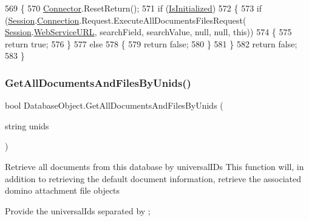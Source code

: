 \begin{DoxyCode}
569     \{
570         \mbox{\hyperlink{class_connector}{Connector}}.ResetReturn();
571         \textcolor{keywordflow}{if} (\mbox{\hyperlink{class_database_object_a5fe036d32a30eb10d1b3f6a30263f740}{IsInitialized}})
572         \{
573             \textcolor{keywordflow}{if} (\mbox{\hyperlink{class_database_object_aa8484162b7d2a7c4c9426bca13c64c07}{Session}}.\mbox{\hyperlink{class_session_object_a014bdbf705a753540e19bfb53030c55c}{Connection}}.Request.ExecuteAllDocumentsFilesRequest(
      \mbox{\hyperlink{class_database_object_aa8484162b7d2a7c4c9426bca13c64c07}{Session}}.\mbox{\hyperlink{class_session_object_a697c071c812fbf7ad1166b896fb44c16}{WebServiceURL}}, searchField, searchValue, null, null, \textcolor{keyword}{this}))
574             \{
575                 \textcolor{keywordflow}{return} \textcolor{keyword}{true};
576             \}
577             \textcolor{keywordflow}{else}
578             \{
579                 \textcolor{keywordflow}{return} \textcolor{keyword}{false};
580             \}
581         \}
582         \textcolor{keywordflow}{return} \textcolor{keyword}{false};
583     \}
\end{DoxyCode}
\mbox{\label{class_database_object_a9332713c924ab14195fe51bf0b8d35d1}} 
\subsubsection{\texorpdfstring{Get\+All\+Documents\+And\+Files\+By\+Unids()}{GetAllDocumentsAndFilesByUnids()}\hspace{0.1cm}{\footnotesize\ttfamily [1/2]}}
{\footnotesize\ttfamily bool Database\+Object.\+Get\+All\+Documents\+And\+Files\+By\+Unids (\begin{DoxyParamCaption}\item[{string}]{unids }\end{DoxyParamCaption})}



Retrieve all documents from this database by universal\+I\+Ds This function will, in addition to retrieving the default document information, retrieve the associated domino attachment file objects 

Provide the universal\+Ids separated by ;

